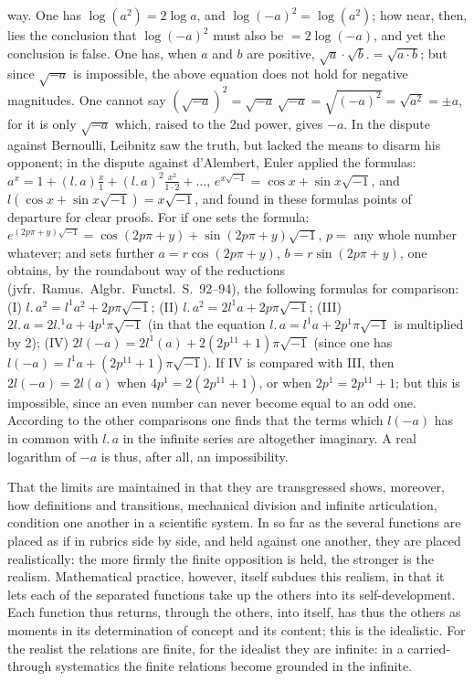 \documentclass[12pt]{book}
\begin{document}
{way. One has $\log(a^{2}) = 2\log a$, and $\log(-a)^{2} = \log(a^{2})$; how near,
then, lies the conclusion that $\log(-a)^{2}$ must also be $= 2\log(-a)$, and yet the
conclusion is false. One has, when $a$ and $b$ are positive,
$\sqrt{a}\cdot\sqrt{b}. = \sqrt{a\cdot b}$; but since $\sqrt{-a}$ is impossible, the
above equation does not hold for negative magnitudes. One cannot say
$(\sqrt{-a})^{2} = \sqrt{-a}\,\sqrt{-a} = \sqrt{(-a)^{2}} = \sqrt{a^{2}} = \pm a$,
for it is only $\sqrt{-a}$ which, raised to the 2nd power, gives $-a$. In the dispute
against Bernoulli, Leibnitz saw the truth, but lacked the means to disarm his
opponent; in the dispute against d'Alembert, Euler applied the formulas:
$a^{x} = 1 + (l.\,a)\frac{x}{1} + (l.\,a)^{2}\frac{x^{2}}{1\cdot 2} + \dots$,
$e^{x\sqrt{-1}} = \cos x + \sin x\sqrt{-1}$, and
$l(\cos x + \sin x\sqrt{-1}) = x\sqrt{-1}$, and found in these formulas points of
departure for clear proofs. For if one sets the formula:
$e^{(2p\pi+y)\sqrt{-1}} = \cos(2p\pi+y) + \sin(2p\pi+y)\sqrt{-1}$, $p =$ any
whole number whatever; and sets further $a = r\cos(2p\pi+y)$,
$b = r\sin(2p\pi+y)$, one obtains, by the roundabout way of the reductions (jvfr.\
Ramus.\ Algbr.\ Functsl.\ S.\ 92--94), the following formulas for comparison:
(I) $l.\,a^{2} = l^{1}a^{2} + 2p\pi\sqrt{-1}$;
(II) $l.\,a^{2} = 2l^{1}a + 2p\pi\sqrt{-1}$;
(III) $2l.\,a = 2l.^{1}a + 4p^{1}\pi\sqrt{-1}$ (in that the equation
$l.\,a = l^{1}a + 2p^{1}\pi\sqrt{-1}$ is multiplied by 2);
(IV) $2l(-a) = 2l^{1}(a) + 2(2p^{11}+1)\pi\sqrt{-1}$ (since one has
$l(-a) = l^{1}a + (2p^{11}+1)\pi\sqrt{-1}$). If IV is compared with III, then
$2l(-a) = 2l(a)$ when $4p^{1} = 2(2p^{11}+1)$, or when $2p^{1} = 2p^{11}+1$;
but this is impossible, since an even number can never become equal to an odd one.
According to the other comparisons one finds that the terms which $l(-a)$ has in
common with $l.\,a$ in the infinite series are altogether imaginary. A real logarithm
of $-a$ is thus, after all, an impossibility.}

That the limits are maintained in that they are transgressed shows, moreover, how
definitions and transitions, mechanical division and infinite articulation, condition
one another in a scientific system. In so far as the several functions are placed as
if in rubrics side by side, and held against one another, they are placed
realistically: the more firmly the finite opposition is held, the
stronger is the realism. Mathematical practice, however, itself subdues this realism,
in that it lets each of the separated functions take up the others into its
self-development. Each function thus returns, through the others, into itself, has
thus the others as moments in its determination of concept and its content; this is
the idealistic. For the realist the relations are finite, for the idealist they are
infinite: in a carried-through systematics the finite relations become grounded in
the infinite.
\end{document}
